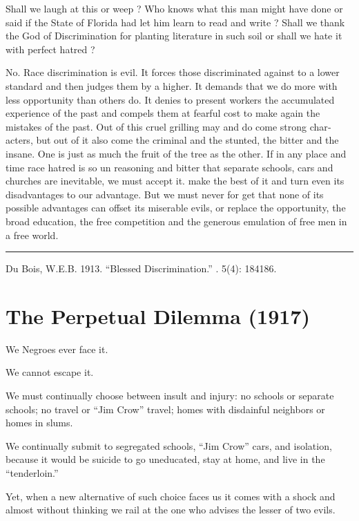 \documentclass[letterpaper,10pt,english]{jupyterBook}
\begin{document}
\sphinxAtStartPar
Shall we laugh at this or weep ? Who knows what this man might have done or said if the State of Florida had let him learn to read and write ? Shall we thank the God of Discrimination for planting literature in such soil or shall we hate it with perfect hatred ?

\sphinxAtStartPar
No. Race discrimination is evil. It forces those discriminated against to a lower standard and then judges them by a higher. It demands that we do more with less opportunity than others do. It denies to present workers the accumu­lated experience of the past and compels them at fearful cost to make again the mistakes of the past. Out of this cruel grilling may and do come strong char­acters, but out of it also come\sphinxhyphen{} the criminal and the stunted, the bitter and the insane. One is just as much the fruit of the tree as the other. If in any place and time race hatred is so un­ reasoning and bitter that separate
schools, cars and churches are inevita­ble, we must accept it. make the best of it and turn even its disadvantages to our advantage. But we must never for­ get that none of its possible advantages can offset its miserable evils, or replace the opportunity, the broad education, the free competition and the generous emul­ation of free men in a free world.


\bigskip\hrule\bigskip


\sphinxAtStartPar
{} Du Bois, W.E.B. 1913. “Blessed Discrimination.”  . 5(4): 184\sphinxhyphen{}186.


\section{The Perpetual Dilemma (1917)}
\label{\detokenize{Volumes/13/06/perpetual_dilemma:the-perpetual-dilemma-1917}}\label{\detokenize{Volumes/13/06/perpetual_dilemma::doc}}
\sphinxAtStartPar
We Negroes ever face it.

\sphinxAtStartPar
We cannot escape it.

\sphinxAtStartPar
We must continually choose between insult and injury: no schools or separate schools; no travel or “Jim Crow” travel; homes with disdainful neighbors or homes in slums.

\sphinxAtStartPar
We continually submit to segregated schools, “Jim Crow” cars, and isolation, because it would be suicide to go uneducated, stay at home, and live in the “tenderloin.”

\sphinxAtStartPar
Yet, when a new alternative of such choice faces us it comes with a shock and almost without thinking we rail at the one who advises the lesser of two evils.
\end{document}
